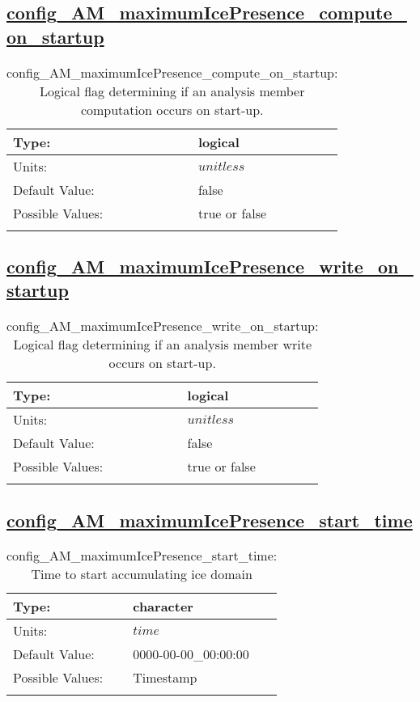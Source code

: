\subsection[config\_AM\_maximumIcePresence\_compute\_on\_startup]{\hyperref[sec:nm_tab_AM_maximumIcePresence]{config\_AM\_maximumIcePresence\_compute\_on\_startup}}
\label{subsec:nm_sec_config_AM_maximumIcePresence_compute_on_startup}
\begin{center}
\begin{longtable}{| p{2.0in} || p{4.0in} |}
    \hline
    Type: & logical \\
    \hline
    Units: & $unitless$ \\
    \hline
    Default Value: & false \\
    \hline
    Possible Values: & true or false \\
    \hline
    \caption{config\_AM\_maximumIcePresence\_compute\_on\_startup: Logical flag determining if an analysis member computation occurs on start-up.}
\end{longtable}
\end{center}
\subsection[config\_AM\_maximumIcePresence\_write\_on\_startup]{\hyperref[sec:nm_tab_AM_maximumIcePresence]{config\_AM\_maximumIcePresence\_write\_on\_startup}}
\label{subsec:nm_sec_config_AM_maximumIcePresence_write_on_startup}
\begin{center}
\begin{longtable}{| p{2.0in} || p{4.0in} |}
    \hline
    Type: & logical \\
    \hline
    Units: & $unitless$ \\
    \hline
    Default Value: & false \\
    \hline
    Possible Values: & true or false \\
    \hline
    \caption{config\_AM\_maximumIcePresence\_write\_on\_startup: Logical flag determining if an analysis member write occurs on start-up.}
\end{longtable}
\end{center}
\subsection[config\_AM\_maximumIcePresence\_start\_time]{\hyperref[sec:nm_tab_AM_maximumIcePresence]{config\_AM\_maximumIcePresence\_start\_time}}
\label{subsec:nm_sec_config_AM_maximumIcePresence_start_time}
\begin{center}
\begin{longtable}{| p{2.0in} || p{4.0in} |}
    \hline
    Type: & character \\
    \hline
    Units: & $time$ \\
    \hline
    Default Value: & 0000-00-00\_00:00:00 \\
    \hline
    Possible Values: & Timestamp \\
    \hline
    \caption{config\_AM\_maximumIcePresence\_start\_time: Time to start accumulating ice domain}
\end{longtable}
\end{center}
